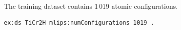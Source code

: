 The training dataset contains 1\,019 atomic configurations.
\begin{lstlisting}[language=turtle]
ex:ds-TiCr2H mlips:numConfigurations 1019 .
\end{lstlisting}
